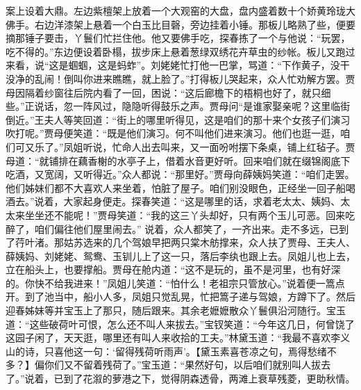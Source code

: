 \documentclass[12pt,oneside]{book}
\begin{document}
案上设着大鼎。左边紫檀架上放着一个大观窑的大盘，盘内盛着数十个娇黄玲珑大佛手。右边洋漆架上悬着一个白玉比目磬，旁边挂着小锤。那板儿略熟了些，便要摘那锤子要击，丫鬟们忙拦住他。他又要佛手吃，探春拣了一个与他说：“玩罢，吃不得的。”东边便设着卧榻，拔步床上悬着葱绿双绣花卉草虫的纱帐。板儿又跑过来看，说“这是蝈蝈，这是蚂蚱”。刘姥姥忙打他一巴掌，骂道：“下作黄子，没干没净的乱闹！倒叫你进来瞧瞧，就上脸了。”打得板儿哭起来，众人忙劝解方罢。贾母因隔着纱窗往后院内看了一回，困说：“这后廊檐下的梧桐也好了，就只细些。”正说话，忽一阵风过，隐隐听得鼓乐之声。贾母问“是谁家娶亲呢？这里临街倒近。”王夫人等笑回道：“街上的哪里听得见，这是咱们的那十来个女孩子们演习吹打呢。”贾母便笑道：“既是他们演习。何不叫他们进来演习。他们也逛一逛，咱们可又乐了。”凤姐听说，忙命人出去叫来，又一面吩咐摆下条桌，铺上红毡子。贾母道：“就铺排在藕香榭的水亭子上，借着水音更好听。回来咱们就在缀锦阁底下吃酒，又宽阔，又听得近。”众人都说：“那里好。”贾母向薛姨妈笑道：“咱们走罢。他们姊妹们都不大喜欢人来坐着，怕脏了屋子。咱们别没眼色，正经坐一回子船喝酒去。”说着，大家起身便走。探春笑道：“这是哪里的话，求着老太太、姨妈、太太来坐坐还不能呢！”贾母笑道：“我的这三丫头却好，只有两个玉儿可恶。回来吃醉了，咱们偏往他们屋里闹去。”
说着，众人都笑了，一齐出来。走不多远，已到了荇叶渚。那姑苏选来的几个驾娘早把两只棠木舫撑来，众人扶了贾母、王夫人、薛姨妈、刘姥姥、鸳鸯、玉钏儿上了这一只，落后李纨也跟上去。凤姐儿也上去，立在船头上，也要撑船。贾母在舱内道：“这不是玩的，虽不是河里，也有好深的。你快不给我进来！”凤姐儿笑道：“怕什么！老祖宗只管放心。”说着便一篙点开。到了池当中，船小人多，凤姐只觉乱晃，忙把篙子递与驾娘，方蹲下了。然后迎春姊妹等并宝玉上了那只，随后跟来。其余老嬷嬷散众丫鬟俱沿河随行。宝玉道：“这些破荷叶可恨，怎么还不叫人来拔去。”宝钗笑道：“今年这几日，何曾饶了这园子闲了，天天逛，哪里还有叫人来收拾的工夫。”林黛玉道：“我最不喜欢李义山的诗，只喜他这一句：‘留得残荷听雨声’。【黛玉素喜苍凉之句，焉得愁绪不多？】偏你们又不留着残荷了。”宝玉道：“果然好句，以后咱们就别叫人拔去了。”说着，已到了花溆的萝港之下，觉得阴森透骨，两滩上衰草残菱，更助秋情。
\end{document}
